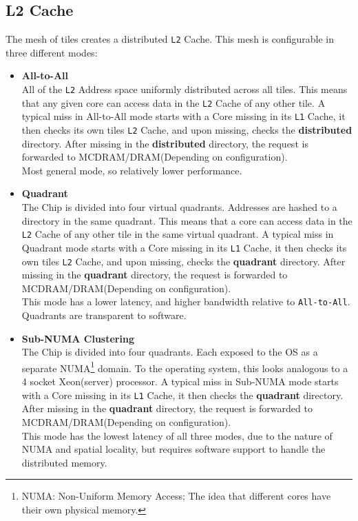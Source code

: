 \documentclass[bsc,frontabs,twoside,singlespacing,parskip,deptreport]{infthesis}     %
\begin{document}
\subsection{L2 Cache}
The mesh of tiles creates a distributed \texttt{L2} Cache. This mesh is configurable in three different modes:
\begin{itemize}

    \item \textbf{All-to-All} \\
    All of the \texttt{L2} Address space uniformly distributed across all tiles. This means that any given core can access data in the \texttt{L2} Cache of any other tile. A typical miss in All-to-All mode starts with a Core missing in its \texttt{L1} Cache, it then checks its own tiles \texttt{L2} Cache, and upon missing, checks the \textbf{distributed} directory. After missing in the \textbf{distributed} directory, the request is forwarded to MCDRAM/DRAM(Depending on configuration).\\
    Most general mode, so relatively lower performance.
    
    \item \textbf{Quadrant} \\
    The Chip is divided into four virtual quadrants. Addresses are hashed to a directory in the same quadrant. This means that a core can access data in the \texttt{L2} Cache of any other tile in the same virtual quadrant. A typical miss in Quadrant mode starts with a Core missing in its \texttt{L1} Cache, it then checks its own tiles \texttt{L2} Cache, and upon missing, checks the \textbf{quadrant} directory. After missing in the \textbf{quadrant} directory, the request is forwarded to MCDRAM/DRAM(Depending on configuration).\\
    This mode has a lower latency, and higher bandwidth relative to \texttt{All-to-All}. Quadrants are transparent to software.
    
    \item \textbf{Sub-NUMA Clustering}\label{snc4-explained} \\
    The Chip is divided into four quadrants. Each exposed to the OS as a separate NUMA\footnote{NUMA: Non-Uniform Memory Access; The idea that different cores have their own physical memory.} domain. To the operating system, this looks analogous to a 4 socket Xeon(server) processor. A typical miss in Sub-NUMA mode starts with a Core missing in its \texttt{L1} Cache, it then checks the \textbf{quadrant} directory. After missing in the \textbf{quadrant} directory, the request is forwarded to MCDRAM/DRAM(Depending on configuration). \\
    This mode has the lowest latency of all three modes, due to the nature of NUMA and spatial locality, but requires software support to handle the distributed memory.
    
\end{itemize}
\end{document}

